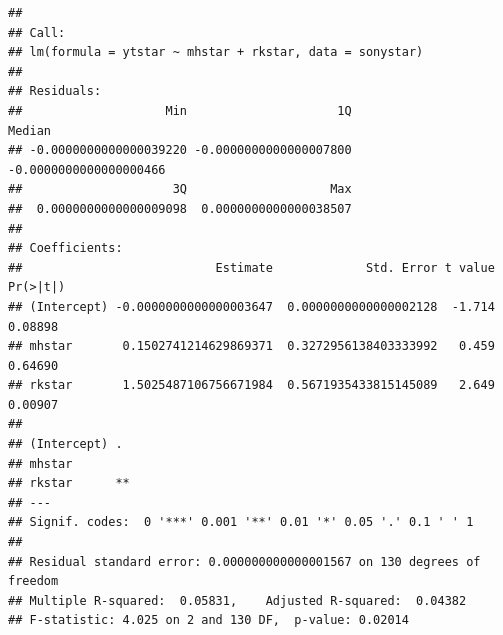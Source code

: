 \documentclass[]{article}
\newenvironment{Shaded}{\begin{snugshade}}{\end{snugshade}}
\newcommand{\KeywordTok}[1]{\textcolor[rgb]{0.13,0.29,0.53}{\textbf{#1}}}
\newcommand{\DataTypeTok}[1]{\textcolor[rgb]{0.13,0.29,0.53}{#1}}
\newcommand{\DecValTok}[1]{\textcolor[rgb]{0.00,0.00,0.81}{#1}}
\newcommand{\StringTok}[1]{\textcolor[rgb]{0.31,0.60,0.02}{#1}}
\newcommand{\OperatorTok}[1]{\textcolor[rgb]{0.81,0.36,0.00}{\textbf{#1}}}
\newcommand{\NormalTok}[1]{#1}
\begin{document}
\begin{Shaded}
\end{Shaded}

\begin{verbatim}
## 
## Call:
## lm(formula = ytstar ~ mhstar + rkstar, data = sonystar)
## 
## Residuals:
##                    Min                     1Q                 Median 
## -0.0000000000000039220 -0.0000000000000007800 -0.0000000000000000466 
##                     3Q                    Max 
##  0.0000000000000009098  0.0000000000000038507 
## 
## Coefficients:
##                           Estimate             Std. Error t value Pr(>|t|)
## (Intercept) -0.0000000000000003647  0.0000000000000002128  -1.714  0.08898
## mhstar       0.1502741214629869371  0.3272956138403333992   0.459  0.64690
## rkstar       1.5025487106756671984  0.5671935433815145089   2.649  0.00907
##               
## (Intercept) . 
## mhstar        
## rkstar      **
## ---
## Signif. codes:  0 '***' 0.001 '**' 0.01 '*' 0.05 '.' 0.1 ' ' 1
## 
## Residual standard error: 0.000000000000001567 on 130 degrees of freedom
## Multiple R-squared:  0.05831,    Adjusted R-squared:  0.04382 
## F-statistic: 4.025 on 2 and 130 DF,  p-value: 0.02014
\end{verbatim}
\end{document}
